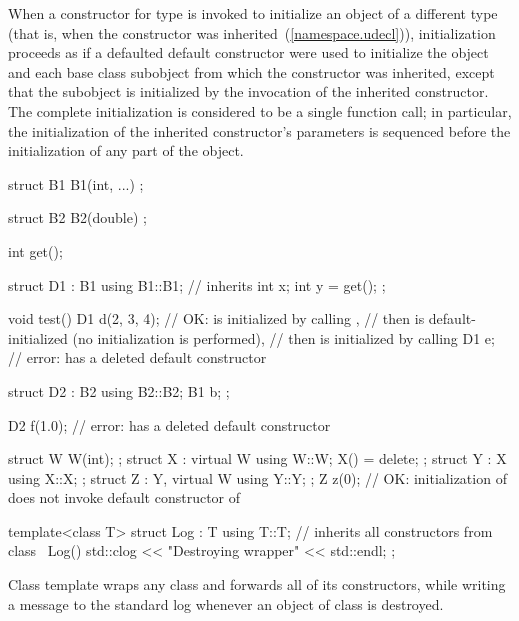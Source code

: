 \pnum
When a constructor for type  is invoked
to initialize an object of a different type 
(that is, when the constructor was inherited~(\ref{namespace.udecl})),
initialization proceeds as if a defaulted default constructor
were used to initialize the  object and
each base class subobject from which the constructor was inherited,
except that the  subobject is initialized
by the invocation of the inherited constructor.
The complete initialization is considered to be a single function call;
in particular, the initialization of the inherited constructor's parameters
is sequenced before the initialization of any part of the  object.
\begin{example}
\begin{codeblock}
struct B1 {
  B1(int, ...) { }
};

struct B2 {
  B2(double) { }
};

int get();

struct D1 : B1 {
  using B1::B1;     // inherits 
  int x;
  int y = get();
};

void test() {
  D1 d(2, 3, 4);    // OK:  is initialized by calling ,
                    // then  is default-initialized (no initialization is performed),
                    // then  is initialized by calling 
  D1 e;             // error:  has a deleted default constructor
}

struct D2 : B2 {
  using B2::B2;
  B1 b;
};

D2 f(1.0);          // error:  has a deleted default constructor

struct W { W(int); };
struct X : virtual W { using W::W; X() = delete; };
struct Y : X { using X::X; };
struct Z : Y, virtual W { using Y::Y; };
Z z(0);             // OK: initialization of  does not invoke default constructor of 

template<class T> struct Log : T {
  using T::T;       // inherits all constructors from class 
  ~Log() { std::clog << "Destroying wrapper" << std::endl; }
};
\end{codeblock}
Class template  wraps any class and forwards all of its constructors,
while writing a message to the standard log
whenever an object of class  is destroyed.
\end{example}

